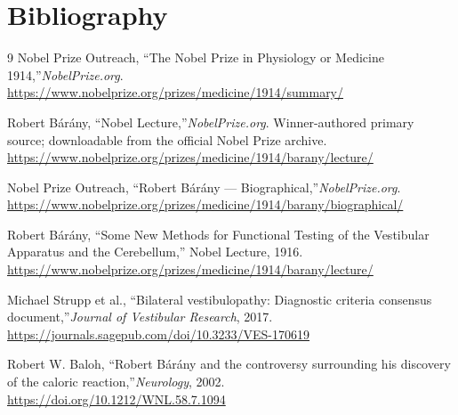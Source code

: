 \section{Bibliography}

\begin{thebibliography}{9}
Nobel Prize Outreach, ``The Nobel Prize in Physiology or Medicine 1914,''\emph{NobelPrize.org}.\\
\url{https://www.nobelprize.org/prizes/medicine/1914/summary/}

Robert B\'ar\'any, ``Nobel Lecture,''\emph{NobelPrize.org}. Winner-authored primary source; downloadable from the official Nobel Prize archive.\\
\url{https://www.nobelprize.org/prizes/medicine/1914/barany/lecture/}

Nobel Prize Outreach, ``Robert B\'ar\'any --- Biographical,''\emph{NobelPrize.org}.\\
\url{https://www.nobelprize.org/prizes/medicine/1914/barany/biographical/}

Robert B\'ar\'any, ``Some New Methods for Functional Testing of the Vestibular Apparatus and the Cerebellum,'' Nobel Lecture, 1916.\\
\url{https://www.nobelprize.org/prizes/medicine/1914/barany/lecture/}

Michael Strupp et al., ``Bilateral vestibulopathy: Diagnostic criteria consensus document,''\emph{Journal of Vestibular Research}, 2017.\\
\url{https://journals.sagepub.com/doi/10.3233/VES-170619}

Robert W. Baloh, ``Robert B\'ar\'any and the controversy surrounding his discovery of the caloric reaction,''\emph{Neurology}, 2002.\\
\url{https://doi.org/10.1212/WNL.58.7.1094}
\end{thebibliography}
